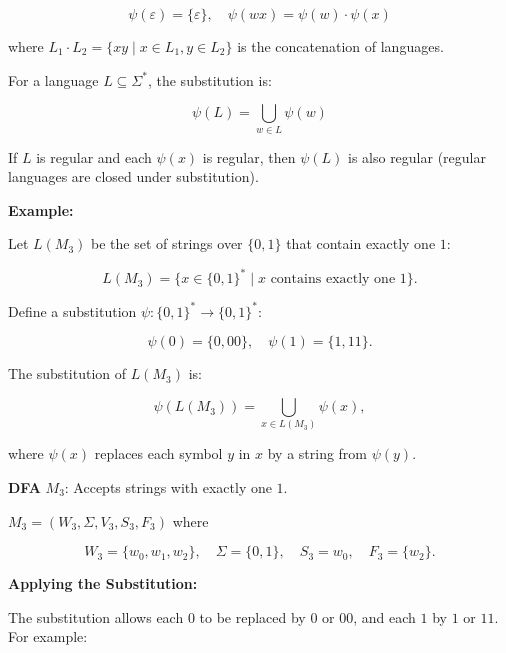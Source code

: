 \documentclass[12pt,a4paper,openany]{article}
\begin{document}
\[\psi(\varepsilon) = \{\varepsilon\}, \quad \psi(wx) = \psi(w) \cdot \psi(x)\]

where $L_1 \cdot L_2 = \{xy \mid x \in L_1, y \in L_2\}$ is the concatenation of languages.

For a language $L \subseteq \Sigma^*$, the substitution is:

\[\psi(L) = \bigcup_{w \in L} \psi(w)\]

If $L$ is regular and each $\psi(x)$ is regular, then $\psi(L)$ is also regular (regular languages are closed under substitution).

\textbf{Example:}

Let $L(M_3)$ be the set of strings over $\{0,1\}$ that contain exactly one $1$:

\[ L(M_3) = \{x \in \{0,1\}^* \mid x \text{ contains exactly one } 1 \}. \]

Define a substitution $\psi: \{0,1\}^* \to \{0,1\}^*$:

\[ \psi(0) = \{0,00\}, \quad \psi(1) = \{1,11\}. \]

The substitution of $L(M_3)$ is:

\[ \psi(L(M_3)) = \bigcup_{x \in L(M_3)} \psi(x), \]

where $\psi(x)$ replaces each symbol $y$ in $x$ by a string from $\psi(y)$.

\textbf{DFA} $M_3$: Accepts strings with exactly one $1$.

$M_3 = (W_3, \Sigma, V_3, S_3, F_3)$ where

\[ W_3 = \{w_0,w_1,w_2\}, \quad \Sigma = \{0,1\}, \quad S_3 = w_0, \quad F_3 = \{w_2\}. \]

\begin{center}
\end{center}

\textbf{Applying the Substitution:}

The substitution allows each $0$ to be replaced by $0$ or $00$, and each $1$ by $1$ or $11$. For example:
\end{document}
